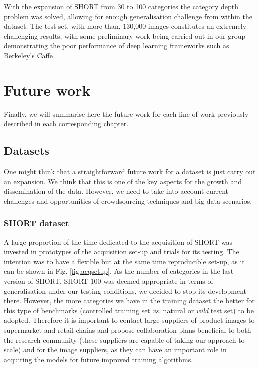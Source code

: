 With the expansion of SHORT from 30 to 100 categories the category depth problem was solved, allowing for enough generalisation challenge from within the dataset. The test set, with more than, 130,000 images constitutes an extremely challenging results, with some preliminary work  being carried out in our group demonstrating the poor performance of deep learning frameworks such as Berkeley's Caffe \cite{jia2014caffe}.

\section{Future work}

Finally, we will summarise here the future work for each line of work previously described in each corresponding chapter.

\subsection{Datasets}

One might think that a straightforward future work for a dataset is just carry out an expansion. We think that this is one of the key aspects for the growth and dissemination of the data. However, we need to take into account current challenges and opportunities of crowdsourcing techniques and big data scenarios.

\subsubsection{SHORT dataset}

A large proportion of the time dedicated to the acquisition of SHORT was invested in prototypes of the acquisition set-up and trials for its testing. The intention was to have a flexible but at the same time reproducible set-up, as it can be shown in Fig. \ref{fig:acqsetup}. As the number of categories in the last version of SHORT, SHORT-100 was deemed appropriate in terms of generalisation under our testing conditions, we decided to stop its development there. However, the more categories we have in the training dataset the better for this type of benchmarks (controlled training set \textit{vs.} natural or \textit{wild} test set) to be adopted. Therefore it is important to contact large suppliers of product images to supermarket and retail chains and propose collaboration plans beneficial to both the research community (these suppliers are capable of taking our approach to scale) and for the image suppliers, as they can have an important role in acquiring the models for future improved training algorithms.

